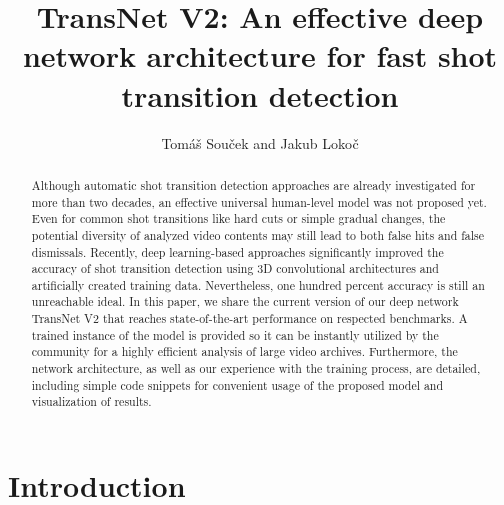 \documentclass[sigconf]{acmart}
\begin{document}
\title{TransNet V2: An effective deep network architecture for fast shot transition detection}



\author{Tom\'{a}\v{s} Sou\v{c}ek and Jakub Loko\v{c}}



\begin{abstract}
Although automatic shot transition detection approaches are already investigated for more than two decades, an effective universal human-level model was not proposed yet. Even for common shot transitions like hard cuts or simple gradual changes, the potential diversity of analyzed video contents may still lead to both false hits and false dismissals. Recently, deep learning-based approaches significantly improved the accuracy of shot transition detection using 3D convolutional architectures and artificially created training data. Nevertheless, one hundred percent accuracy is still an unreachable ideal. In this paper, we share the current version of our deep network TransNet V2 that reaches state-of-the-art performance on respected benchmarks. A trained instance of the model is provided so it can be instantly utilized by the community for a highly efficient analysis of large video archives. Furthermore, the network architecture, as well as our experience with the training process, are detailed, including simple code snippets for convenient usage of the proposed model and visualization of results.
\end{abstract}








\maketitle

\section{Introduction}
\end{document}
